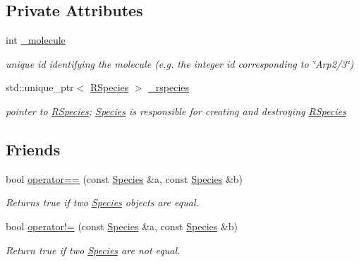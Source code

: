 \subsection*{Private Attributes}
\begin{DoxyCompactItemize}
\item 
int \hyperlink{classchem_1_1Species_afc69264ab4c24ac17b7d1946b1b380f4}{\-\_\-molecule}
\begin{DoxyCompactList}\small\item\em unique id identifying the molecule (e.\-g. the integer id corresponding to \char`\"{}\-Arp2/3\char`\"{}) \end{DoxyCompactList}\item 
std\-::unique\-\_\-ptr$<$ \hyperlink{classchem_1_1RSpecies}{R\-Species} $>$ \hyperlink{classchem_1_1Species_ae6e8e6ad9e05b4eb3f28cf20249caa67}{\-\_\-rspecies}
\begin{DoxyCompactList}\small\item\em pointer to \hyperlink{classchem_1_1RSpecies}{R\-Species}; \hyperlink{classchem_1_1Species}{Species} is responsible for creating and destroying \hyperlink{classchem_1_1RSpecies}{R\-Species} \end{DoxyCompactList}\end{DoxyCompactItemize}
\subsection*{Friends}
\begin{DoxyCompactItemize}
\item 
bool \hyperlink{classchem_1_1Species_a22987c5719b74c50465256ea5b9d80bf}{operator==} (const \hyperlink{classchem_1_1Species}{Species} \&a, const \hyperlink{classchem_1_1Species}{Species} \&b)
\begin{DoxyCompactList}\small\item\em Returns true if two \hyperlink{classchem_1_1Species}{Species} objects are equal. \end{DoxyCompactList}\item 
bool \hyperlink{classchem_1_1Species_aff630d716711fbbab3bc7f598230316b}{operator!=} (const \hyperlink{classchem_1_1Species}{Species} \&a, const \hyperlink{classchem_1_1Species}{Species} \&b)
\begin{DoxyCompactList}\small\item\em Return true if two \hyperlink{classchem_1_1Species}{Species} are not equal. \end{DoxyCompactList}\end{DoxyCompactItemize}


